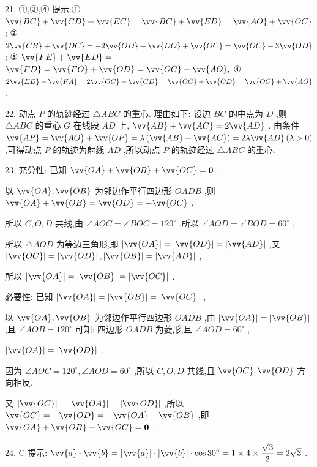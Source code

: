 21. ①,③,④ 提示:① $\vv{BC} + \vv{CD} + \vv{EC} = \vv{BC} + \vv{ED} = \vv{AO} + \vv{OC}$ ; ② $2\vv{CB} + \vv{DC} =  - 2\vv{OD} + \vv{DO} + \vv{OC} = \vv{OC} - 3\vv{OD}$ ; ③ $\vv{FE} + \vv{ED} =$  $\vv{FD} = \vv{FO} + \vv{OD} = \vv{OC} + \vv{AO},$ ④ $2\vv{ED} - \vv{FA} = 2\vv{OC} + \vv{CD} = \vv{OC} + \vv{OD} = \vv{OC} + \vv{AO}$ .

22. 动点 $P$ 的轨迹经过 $\bigtriangleup  {ABC}$ 的重心. 理由如下: 设边 ${BC}$ 的中点为 $D$ ,则 $\bigtriangleup  {ABC}$ 的重心 $G$ 在线段 ${AD}$ 上, $\vv{AB} + \vv{AC} = 2\vv{AD}$ . 由条件 $\vv{AP} = \vv{AO} + \vv{OP} = \lambda \left( {\vv{AB} + \vv{AC}}\right)  = {2\lambda }\vv{AD}\left( {\lambda  > 0}\right)$ ,可得动点 $P$ 的轨迹为射线 ${AD}$ ,所以动点 $P$ 的轨迹经过 $\bigtriangleup  {ABC}$ 的重心.

23. 充分性: 已知 $\vv{OA} + \vv{OB} + \vv{OC} = \mathbf{0}$ .

以 $\vv{OA},\vv{OB}$ 为邻边作平行四边形 ${OADB}$ ,则 $\vv{OA} + \vv{OB} = \vv{OD} =  - \vv{OC}$ ,

所以 $C,O,D$ 共线,由 $\angle {AOC} = \angle {BOC} = {120}^{ \circ  }$ ,所以 $\angle {AOD} = \angle {BOD} = {60}^{ \circ  }$ ,

所以 $\bigtriangleup {AOD}$ 为等边三角形,即 $\left| \vv{OA}\right|  = \left| \vv{OD}\right|  = \left| \vv{AD}\right|$ ,又 $\left| \vv{OC}\right|  = \left| \vv{OD}\right| ,\left| \vv{OB}\right|  = \left| \vv{AD}\right|$ ,

所以 $\left| \vv{OA}\right|  = \left| \vv{OB}\right|  = \left| \vv{OC}\right|$ .

必要性: 已知 $\left| \vv{OA}\right|  = \left| \vv{OB}\right|  = \left| \vv{OC}\right|$ ,

以 $\vv{OA},\vv{OB}$ 为邻边作平行四边形 ${OADB}$ ,由 $\left| \vv{OA}\right|  = \left| \vv{OB}\right|$ ,且 $\angle {AOB} = {120}^{ \circ  }$ 可知: 四边形 ${OADB}$ 为菱形,且 $\angle {AOD} = {60}^{ \circ  }$ ,

$\left| \vv{OA}\right|  = \left| \vv{OD}\right|$ .

因为 $\angle {AOC} = {120}^{ \circ  },\angle {AOD} = {60}^{ \circ  }$ ,所以 $C,O,D$ 共线,且 $\vv{OC},\vv{OD}$ 方向相反.

又 $\left| \vv{OC}\right|  = \left| \vv{OA}\right|  = \left| \vv{OD}\right|$ ,所以 $\vv{OC} =  - \vv{OD} =  - \vv{OA} - \vv{OB}$ ,即 $\vv{OA} + \vv{OB} + \vv{OC} = \mathbf{0}$ .

24. C 提示: $\vv{a} \cdot  \vv{b} = \left| \vv{a}\right|  \cdot  \left| \vv{b}\right|  \cdot  \cos {30}^{ \circ  } = 1 \times  4 \times  \dfrac{\sqrt{3}}{2} = 2\sqrt{3}$ .

